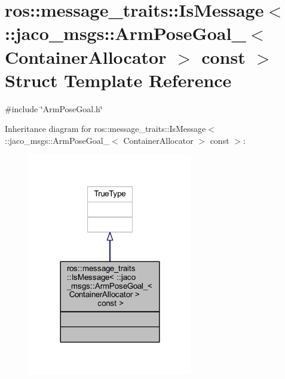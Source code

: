 \hypertarget{structros_1_1message__traits_1_1IsMessage_3_01_1_1jaco__msgs_1_1ArmPoseGoal___3_01ContainerAllocator_01_4_01const_01_01_4}{}\section{ros\+:\+:message\+\_\+traits\+:\+:Is\+Message$<$ \+:\+:jaco\+\_\+msgs\+:\+:Arm\+Pose\+Goal\+\_\+$<$ Container\+Allocator $>$ const $>$ Struct Template Reference}
\label{structros_1_1message__traits_1_1IsMessage_3_01_1_1jaco__msgs_1_1ArmPoseGoal___3_01ContainerAllocator_01_4_01const_01_01_4}


{\ttfamily \#include \char`\"{}Arm\+Pose\+Goal.\+h\char`\"{}}



Inheritance diagram for ros\+:\+:message\+\_\+traits\+:\+:Is\+Message$<$ \+:\+:jaco\+\_\+msgs\+:\+:Arm\+Pose\+Goal\+\_\+$<$ Container\+Allocator $>$ const $>$\+:
\nopagebreak
\begin{figure}[H]
\begin{center}
\leavevmode
\includegraphics[width=204pt]{d9/d44/structros_1_1message__traits_1_1IsMessage_3_01_1_1jaco__msgs_1_1ArmPoseGoal___3_01ContainerAlloc0ef6481c3ffcfcea20e8516868f7336d}
\end{center}
\end{figure}


